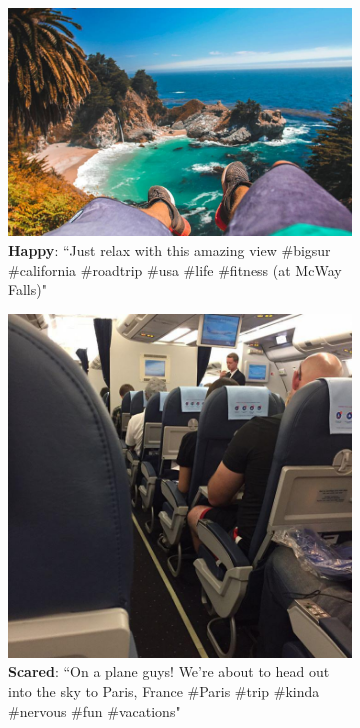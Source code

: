 \begin{figure}
\begin{subfigure}[t]{.5\textwidth}
  \vskip 0pt %
  \centering
  \includegraphics[width=.8\linewidth]{Images/happy.jpg}
  \caption{\textbf{Happy}: ``Just relax with this amazing view \#bigsur \#california \#roadtrip \#usa \#life \#fitness (at McWay Falls)"}
\end{subfigure}
\begin{subfigure}[t]{.5\textwidth}
  \vskip 0pt 
  \centering
  \includegraphics[width=.7\linewidth]{Images/scared.jpg}
  \caption{\textbf{Scared}: ``On a plane guys! We're about to head out into the sky to Paris, France \#Paris \#trip \#kinda \#nervous \#fun \#vacations"}
\end{subfigure}
\begin{subfigure}[t]{.5\textwidth}
  \vskip 0pt
  \centering

\end{subfigure}
\end{figure}
